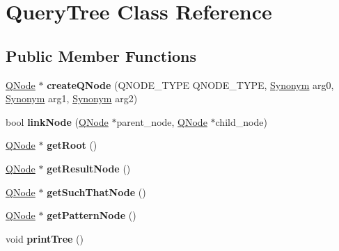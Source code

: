 \hypertarget{class_query_tree}{}\section{Query\+Tree Class Reference}
\label{class_query_tree}
\subsection*{Public Member Functions}
\begin{DoxyCompactItemize}
\item 
\hypertarget{class_query_tree_a2aa423c4bb4d55dcee8325f527bcde18}{}\hyperlink{class_q_node}{Q\+Node} $\ast$ {\bfseries create\+Q\+Node} (Q\+N\+O\+D\+E\+\_\+\+T\+Y\+P\+E Q\+N\+O\+D\+E\+\_\+\+T\+Y\+P\+E, \hyperlink{class_synonym}{Synonym} arg0, \hyperlink{class_synonym}{Synonym} arg1, \hyperlink{class_synonym}{Synonym} arg2)\label{class_query_tree_a2aa423c4bb4d55dcee8325f527bcde18}

\item 
\hypertarget{class_query_tree_ab818c38f20d674702ef37c2f25c5a391}{}bool {\bfseries link\+Node} (\hyperlink{class_q_node}{Q\+Node} $\ast$parent\+\_\+node, \hyperlink{class_q_node}{Q\+Node} $\ast$child\+\_\+node)\label{class_query_tree_ab818c38f20d674702ef37c2f25c5a391}

\item 
\hypertarget{class_query_tree_ade07e83434c5fd377ca1cf340dda13a6}{}\hyperlink{class_q_node}{Q\+Node} $\ast$ {\bfseries get\+Root} ()\label{class_query_tree_ade07e83434c5fd377ca1cf340dda13a6}

\item 
\hypertarget{class_query_tree_ae269eb5413c43d305ce516b2c50c4a4b}{}\hyperlink{class_q_node}{Q\+Node} $\ast$ {\bfseries get\+Result\+Node} ()\label{class_query_tree_ae269eb5413c43d305ce516b2c50c4a4b}

\item 
\hypertarget{class_query_tree_ac806b5b79269fc0297e2ae22c42e1684}{}\hyperlink{class_q_node}{Q\+Node} $\ast$ {\bfseries get\+Such\+That\+Node} ()\label{class_query_tree_ac806b5b79269fc0297e2ae22c42e1684}

\item 
\hypertarget{class_query_tree_a13d533ff13344b0e0f802dc587d1b1aa}{}\hyperlink{class_q_node}{Q\+Node} $\ast$ {\bfseries get\+Pattern\+Node} ()\label{class_query_tree_a13d533ff13344b0e0f802dc587d1b1aa}

\item 
\hypertarget{class_query_tree_a5bee091af795efbce9a1e22346c10292}{}void {\bfseries print\+Tree} ()\label{class_query_tree_a5bee091af795efbce9a1e22346c10292}


\end{DoxyCompactItemize}
